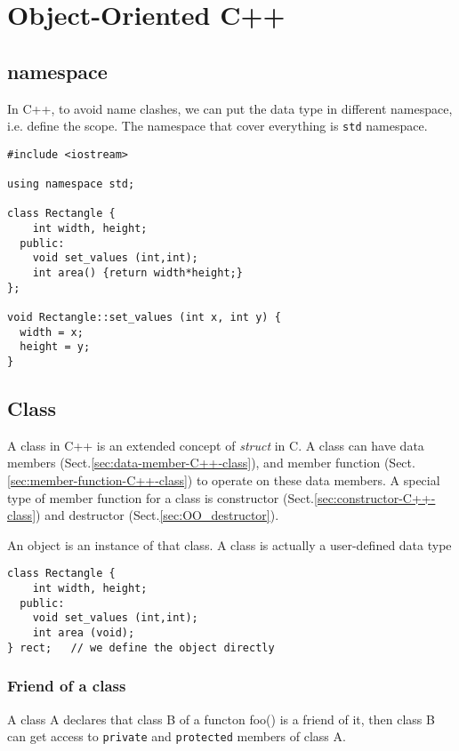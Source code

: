 \chapter{Object-Oriented C++}

\section{namespace}
\label{sec:namespace_C++}

In C++, to avoid name clashes, we can put the data type in different namespace,
i.e. define the scope. The namespace that cover everything is \verb!std! namespace.

\begin{verbatim}
#include <iostream>

using namespace std;

class Rectangle {
    int width, height;
  public:
    void set_values (int,int);
    int area() {return width*height;}
};

void Rectangle::set_values (int x, int y) {
  width = x;
  height = y;
}
\end{verbatim}


\section{Class}
\label{sec:class-C++}

A class in C++ is an extended concept of {\it struct} in C. A class can have
data members (Sect.\ref{sec:data-member-C++-class}), and member function
(Sect.\ref{sec:member-function-C++-class}) to operate on these data members.
A special type of member function for a class is constructor
(Sect.\ref{sec:constructor-C++-class}) and destructor
(Sect.\ref{sec:OO_destructor}).

An object is an instance of that class. A class is actually a user-defined data
type
\begin{verbatim}
class Rectangle {
    int width, height;
  public:
    void set_values (int,int);
    int area (void);
} rect;   // we define the object directly

\end{verbatim}

\subsection{Friend of a class}

A class A declares that class B of a functon foo() is a friend of it, then class
B can get access to \verb!private! and \verb!protected! members of class A.

